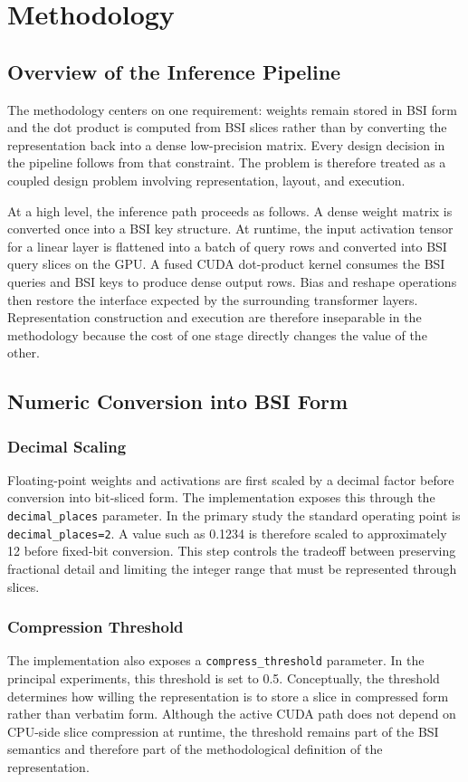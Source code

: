 \section{Methodology}\label{sec:methodology}
\subsection{Overview of the Inference Pipeline}
The methodology centers on one requirement: weights remain stored in BSI form and the dot product is computed from BSI slices rather than by converting the representation back into a dense low-precision matrix. Every design decision in the pipeline follows from that constraint. The problem is therefore treated as a coupled design problem involving representation, layout, and execution.

At a high level, the inference path proceeds as follows. A dense weight matrix is converted once into a BSI key structure. At runtime, the input activation tensor for a linear layer is flattened into a batch of query rows and converted into BSI query slices on the GPU. A fused CUDA dot-product kernel consumes the BSI queries and BSI keys to produce dense output rows. Bias and reshape operations then restore the interface expected by the surrounding transformer layers. Representation construction and execution are therefore inseparable in the methodology because the cost of one stage directly changes the value of the other.

\subsection{Numeric Conversion into BSI Form}
\subsubsection{Decimal Scaling}
Floating-point weights and activations are first scaled by a decimal factor before conversion into bit-sliced form. The implementation exposes this through the \texttt{decimal\_places} parameter. In the primary study the standard operating point is \texttt{decimal\_places=2}. A value such as 0.1234 is therefore scaled to approximately 12 before fixed-bit conversion. This step controls the tradeoff between preserving fractional detail and limiting the integer range that must be represented through slices.

\subsubsection{Compression Threshold}
The implementation also exposes a \texttt{compress\_threshold} parameter. In the principal experiments, this threshold is set to 0.5. Conceptually, the threshold determines how willing the representation is to store a slice in compressed form rather than verbatim form. Although the active CUDA path does not depend on CPU-side slice compression at runtime, the threshold remains part of the BSI semantics and therefore part of the methodological definition of the representation.


